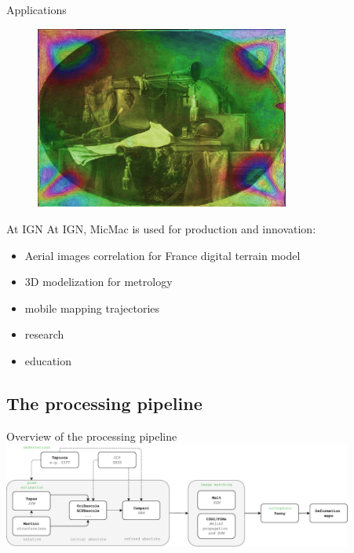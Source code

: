 \documentclass{beamer}
\begin{document}
		\begin{frame}{Applications}
			 
			\begin{figure}
			  \includegraphics[height=6cm]{../MicmacQuickMay2018/images/usage7}
			\end{figure}

		\end{frame}		      	

		\begin{frame}{At IGN}
		At IGN, MicMac is used for production and innovation:
		\begin{itemize}
			\item  Aerial images correlation for France digital terrain model
  			\item  3D modelization for metrology
  			\item  mobile mapping trajectories
  			\item  research
  			\item  education 
		\end{itemize}
		\end{frame}
		
		   
        \subsection*{The processing pipeline}
            \begin{frame}{Overview of the processing pipeline}
                \centering
                \includegraphics[width=11.5cm]{images/MicMac_architecture.pdf}
                
                
            \end{frame}
\end{document}
